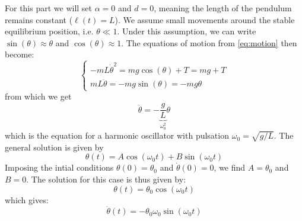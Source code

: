 For this part we will set \(\alpha=0\) and \(d=0\), meaning the length of the pendulum remains constant (\(\ell(t)=L\)). We assume small movements around the stable equilibrium position, i.e. \(\theta \ll 1\). Under this assumption, we can write \(\sin(\theta) \approx \theta\) and \(\cos(\theta) \approx 1\). The equations of motion from \autoref{eq:motion} then become:
\begin{equation}
    \begin{cases}
        -m L \dot\theta^2 = mg\cos(\theta) + T = mg + T \\
        m L \ddot\theta = -mg\sin(\theta) = -mg\theta
    \end{cases}
\end{equation}
from which we get
\begin{equation}
    \ddot\theta = - \underbrace{\frac{g}{L}}_{\omega_0^2} \theta
\end{equation}
which is the equation for a harmonic oscillator with pulsation $\omega_0 = \sqrt{g/L}$. The general solution is given by
\begin{equation}
    \theta(t) = A\cos(\omega_0 t) + B\sin(\omega_0 t)
\end{equation}
Imposing the intial conditions \(\theta(0) = \theta_0\) and \(\dot\theta(0) = 0\), we find \(A = \theta_0\) and \(B = 0\). The solution for this case is thus given by:
\begin{equation}
    \theta(t) = \theta_0 \cos(\omega_0 t)
    \label{eq:analytic_harmonic_pos}
\end{equation}
which gives:
\begin{equation}
    \dot\theta(t) = -\theta_0\omega_0\sin(\omega_0 t)
    \label{eq:analytic_harmonic_speed}
\end{equation}
